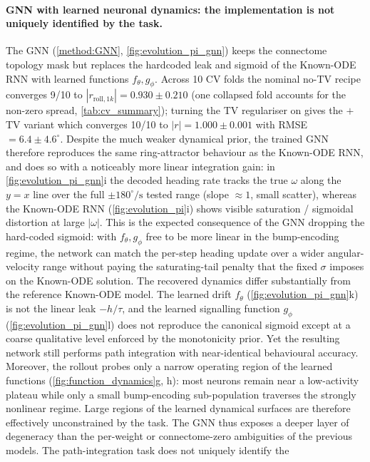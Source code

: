\documentclass[11pt]{article}
\begin{document}
\paragraph{GNN with learned neuronal dynamics: the implementation is not uniquely identified by the task.}
The GNN (\cref{method:GNN}, \cref{fig:evolution_pi_gnn}) keeps the
connectome topology mask but replaces the hardcoded leak and
sigmoid of the Known-ODE RNN with learned functions
$f_\theta, g_\phi$. Across 10 CV folds the nominal no-TV recipe
converges 9/10 to $|r_{\mathrm{roll},1k}| = 0.930 \pm 0.210$
(one collapsed fold accounts for the non-zero spread,
\cref{tab:cv_summary}); turning the TV regulariser on gives the
$+$TV variant which converges 10/10 to $|r| = 1.000 \pm 0.001$
with RMSE $= 6.4 \pm 4.6^\circ$. Despite the much weaker dynamical prior, the
trained GNN therefore reproduces the same ring-attractor behaviour
as the Known-ODE RNN, and does so with a noticeably more linear
integration gain: in \cref{fig:evolution_pi_gnn}i the decoded
heading rate tracks the true $\omega$ along the $y = x$ line over
the full $\pm 180^\circ/\mathrm{s}$ tested range (slope $\approx 1$,
small scatter), whereas the Known-ODE RNN
(\cref{fig:evolution_pi}i) shows visible saturation / sigmoidal
distortion at large $|\omega|$. This is the expected consequence of
the GNN dropping the hard-coded sigmoid: with $f_\theta, g_\phi$
free to be more linear in the bump-encoding regime, the network
can match the per-step heading update over a wider angular-velocity
range without paying the saturating-tail penalty that the fixed
$\sigma$ imposes on the Known-ODE solution. The recovered dynamics
differ substantially from the reference Known-ODE model. The learned drift
$f_\theta$ (\cref{fig:evolution_pi_gnn}k) is not the linear leak
$-h/\tau$, and the learned signalling function $g_\phi$
(\cref{fig:evolution_pi_gnn}l) does not reproduce the canonical
sigmoid except at a coarse qualitative level enforced by the
monotonicity prior. Yet the resulting network still performs path
integration with near-identical behavioural accuracy. Moreover, the rollout probes only a narrow operating region of the
learned functions (\cref{fig:function_dynamics}g, h): most neurons
remain near a low-activity plateau while only a small
bump-encoding sub-population traverses the strongly nonlinear
regime. Large regions of the learned dynamical surfaces are
therefore effectively unconstrained by the task. The GNN thus exposes a deeper layer of degeneracy than the
per-weight or connectome-zero ambiguities of the previous models.
The path-integration task does not uniquely identify the
\end{document}
